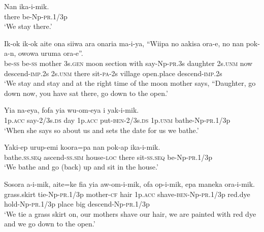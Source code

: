 \ea\label{ex:a:x11}
\gll  Nan  ika-i-mik. \\
there  be-Np-\textsc{pr}.1/3p \\
\glt ‘We stay there.’ \\
\z


\ea\label{ex:a:x12}
\gll  Ik-ok  ik-ok  aite  ona  siiwa  ara  onaria  ma-i-ya,  “Wiipa       no  aakisa  ora-e,  no  nan  pok-a-n,  owowa  uruma                         ora-e”. \\
be-\textsc{ss}  be-\textsc{ss}  mother  3s.\textsc{gen}  moon  section  with  say-Np-\textsc{pr}.3s  daughter 2s.\textsc{unm}  now  descend-\textsc{imp}.2s  2s.\textsc{unm}  there  sit-\textsc{pa}-2s  village  open.place  descend-\textsc{imp}.2s \\




\glt ‘We stay and stay and at the right time of the moon mother says, “Daughter, go down now, you have sat there, go down to the open.’ \\
\z


\ea\label{ex:a:x13}
\gll  Yia  na-eya,  fofa  yia  wu-om-eya          i  yak-i-mik. \\
1p.\textsc{acc}  say-2/3s.\textsc{ds}  day  1p.\textsc{acc}  put-\textsc{ben}-2/3s.\textsc{ds} 1p.\textsc{unm}  bathe-Np-\textsc{pr}.1/3p \\


\glt ‘When she says so about us and sets the date for us we bathe.’ \\
\z


\ea\label{ex:a:x14}
\gll  Yaki-ep  urup-emi  koora=pa  nan  pok-ap  ika-i-mik. \\
bathe.\textsc{ss.seq}  ascend-\textsc{ss}.\textsc{sim}  house-\textsc{loc}  there  sit-\textsc{ss.seq}  be-Np-\textsc{pr}.1/3p \\
\glt ‘We bathe and go (back) up and sit in the house.’ \\
\z


\ea\label{ex:a:x15}
\gll  Sosora  a-i-mik,  aite=ke  fia  yia  aw-om-i-mik,                      ofa  op-i-mik,  epa  maneka  ora-i-mik. \\
grass.skirt  tie-Np-\textsc{pr}.1/3p  mother-\textsc{cf}  hair  1p.\textsc{acc}  shave-\textsc{ben}-Np-\textsc{pr}.1/3p   red.dye  hold-Np-\textsc{pr}.1/3p  place  big  descend-Np-\textsc{pr}.1/3p \\


\glt ‘We tie a grass skirt on, our mothers shave our hair, we are painted with red dye and we go down to the open.’ \\
\z


